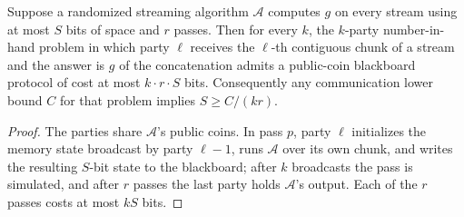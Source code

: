 \begin{proposition}\label{pro:cc-transfer}
Suppose a randomized streaming algorithm $\mathcal{A}$ computes $g$ on every stream
using at most $S$ bits of space and $r$ passes. Then for every $k$, the $k$-party
number-in-hand problem in which party $\ell$ receives the $\ell$-th contiguous chunk
of a stream and the answer is $g$ of the concatenation admits a public-coin
blackboard protocol of cost at most $k \cdot r \cdot S$ bits. Consequently any
communication lower bound $C$ for that problem implies $S \ge C/(k r)$. \eop
\end{proposition}

\begin{proof}
The parties share $\mathcal{A}$'s public coins. In pass $p$, party $\ell$ initializes
the memory state broadcast by party $\ell-1$, runs $\mathcal{A}$ over its own chunk,
and writes the resulting $S$-bit state to the blackboard; after $k$ broadcasts the
pass is simulated, and after $r$ passes the last party holds $\mathcal{A}$'s output.
Each of the $r$ passes costs at most $kS$ bits.
\end{proof}

